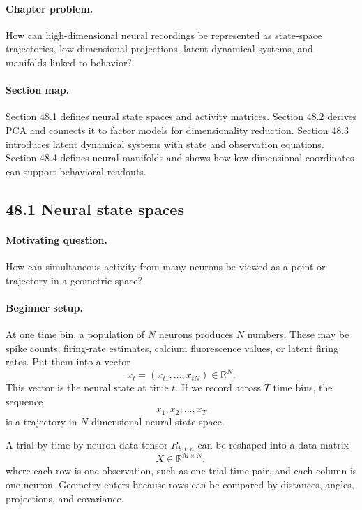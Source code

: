 \paragraph{Chapter problem.}
How can high-dimensional neural recordings be represented as state-space trajectories, low-dimensional projections, latent dynamical systems, and manifolds linked to behavior?

\paragraph{Section map.}
Section 48.1 defines neural state spaces and activity matrices. Section 48.2 derives PCA and connects it to factor models for dimensionality reduction. Section 48.3 introduces latent dynamical systems with state and observation equations. Section 48.4 defines neural manifolds and shows how low-dimensional coordinates can support behavioral readouts.

\subsection{48.1 Neural state spaces}

\paragraph{Motivating question.}
How can simultaneous activity from many neurons be viewed as a point or trajectory in a geometric space?

\paragraph{Beginner setup.}
At one time bin, a population of \(N\) neurons produces \(N\) numbers. These may be spike counts, firing-rate estimates, calcium fluorescence values, or latent firing rates. Put them into a vector
\[
x_t=(x_{t1},\ldots,x_{tN})\in\mathbb R^N.
\]
This vector is the neural state at time \(t\). If we record across \(T\) time bins, the sequence
\[
x_1,x_2,\ldots,x_T
\]
is a trajectory in \(N\)-dimensional neural state space.

A trial-by-time-by-neuron data tensor \(R_{b,t,n}\) can be reshaped into a data matrix
\[
X\in\mathbb R^{M\times N},
\]
where each row is one observation, such as one trial-time pair, and each column is one neuron. Geometry enters because rows can be compared by distances, angles, projections, and covariance.

